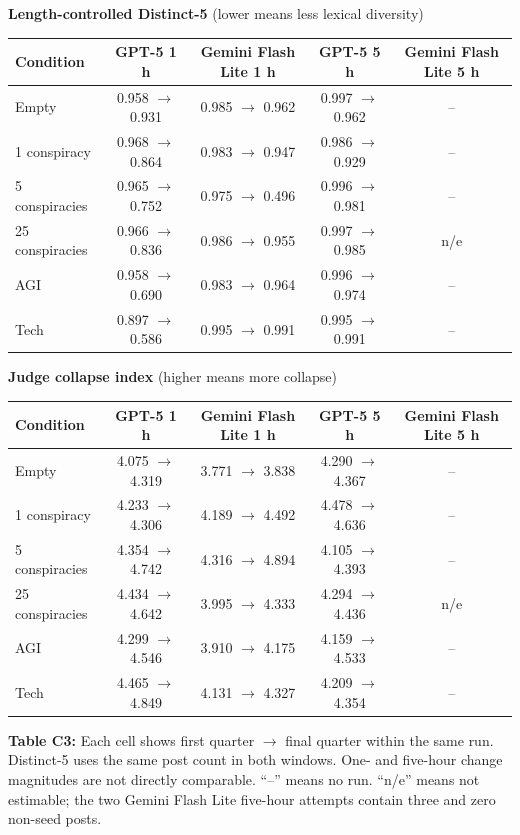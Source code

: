 \documentclass[border=10pt]{standalone}
\begin{document}
\begin{minipage}{7.2in}
\centering
\scriptsize
\setlength{\tabcolsep}{6pt}
\renewcommand{\arraystretch}{1.12}
\textbf{Length-controlled Distinct-5} (lower means less lexical diversity)\par
\vspace{2pt}
\begin{tabular}{lcccc}
\toprule
Condition & GPT-5 1 h & Gemini Flash Lite 1 h & GPT-5 5 h & Gemini Flash Lite 5 h \\
\midrule
Empty & 0.958 $\rightarrow$ 0.931 & 0.985 $\rightarrow$ 0.962 & 0.997 $\rightarrow$ 0.962 & -- \\
1 conspiracy & 0.968 $\rightarrow$ 0.864 & 0.983 $\rightarrow$ 0.947 & 0.986 $\rightarrow$ 0.929 & -- \\
5 conspiracies & 0.965 $\rightarrow$ 0.752 & 0.975 $\rightarrow$ 0.496 & 0.996 $\rightarrow$ 0.981 & -- \\
25 conspiracies & 0.966 $\rightarrow$ 0.836 & 0.986 $\rightarrow$ 0.955 & 0.997 $\rightarrow$ 0.985 & n/e \\
AGI & 0.958 $\rightarrow$ 0.690 & 0.983 $\rightarrow$ 0.964 & 0.996 $\rightarrow$ 0.974 & -- \\
Tech & 0.897 $\rightarrow$ 0.586 & 0.995 $\rightarrow$ 0.991 & 0.995 $\rightarrow$ 0.991 & -- \\
\bottomrule
\end{tabular}

\vspace{9pt}
\textbf{Judge collapse index} (higher means more collapse)\par
\vspace{2pt}
\begin{tabular}{lcccc}
\toprule
Condition & GPT-5 1 h & Gemini Flash Lite 1 h & GPT-5 5 h & Gemini Flash Lite 5 h \\
\midrule
Empty & 4.075 $\rightarrow$ 4.319 & 3.771 $\rightarrow$ 3.838 & 4.290 $\rightarrow$ 4.367 & -- \\
1 conspiracy & 4.233 $\rightarrow$ 4.306 & 4.189 $\rightarrow$ 4.492 & 4.478 $\rightarrow$ 4.636 & -- \\
5 conspiracies & 4.354 $\rightarrow$ 4.742 & 4.316 $\rightarrow$ 4.894 & 4.105 $\rightarrow$ 4.393 & -- \\
25 conspiracies & 4.434 $\rightarrow$ 4.642 & 3.995 $\rightarrow$ 4.333 & 4.294 $\rightarrow$ 4.436 & n/e \\
AGI & 4.299 $\rightarrow$ 4.546 & 3.910 $\rightarrow$ 4.175 & 4.159 $\rightarrow$ 4.533 & -- \\
Tech & 4.465 $\rightarrow$ 4.849 & 4.131 $\rightarrow$ 4.327 & 4.209 $\rightarrow$ 4.354 & -- \\
\bottomrule
\end{tabular}

\vspace{6pt}
\parbox{7.0in}{\scriptsize\textbf{Table C3:} Each cell shows first quarter $\rightarrow$ final quarter within the same run. Distinct-5 uses the same post count in both windows. One- and five-hour change magnitudes are not directly comparable. ``--'' means no run. ``n/e'' means not estimable; the two Gemini Flash Lite five-hour attempts contain three and zero non-seed posts.}
\end{minipage}
\end{document}
